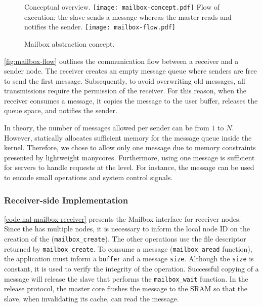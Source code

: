 			\begin{figure}[!tb]
				\centering%
				\caption{Mailbox abstraction concept.}%
				\label{fig:mailbox}%

					{Conceptual overview.}%
					{\texttt{[image: mailbox-concept.pdf]}}%
				\hspace{1cm}%
					{Flow of execution: the slave sends a message whereas the master reads and notifies the sender.}%
					{\texttt{[image: mailbox-flow.pdf]}}%

			\end{figure}

			\autoref{fig:mailbox-flow} outlines the communication flow between a
			receiver and a sender node. The receiver creates an empty message queue
			where senders are free to send the first message. Subsequently, to
			avoid overwriting old messages, all transmissions require the permission
			of the receiver. For this reason,  when the receiver consumes a message,
			it copies the message to the user buffer, releases the queue space, and
			notifies the sender.

			In theory, the number of messages allowed per sender can be from
			$1$ to $N$. However, \nanvixhal statically allocates sufficient
			memory for the message queue inside the kernel. Therefore, we chose
			to allow only one message due to memory constraints presented by
			lightweight manycores. Furthermore, using one message is sufficient	for
			servers to handle requests at the \nanvixmultikernel level. For instance, the
			message can be used to encode small operations and system control signals.

			\subsubsection{Receiver-side Implementation}

					\autoref{code:hal-mailbox-receiver} presents the Mailbox interface for
					receiver nodes. Since the \iocluster has multiple nodes, it is necessary
					to inform the local node ID on the creation of the \mailbox (\texttt{mailbox\_create}). The other
					operations use the file descriptor returned by \texttt{mailbox\_create}.
					To consume a message (\texttt{mailbox\_aread} function), the application must inform a \texttt{buffer} and
					a message \texttt{size}. Although the \texttt{size} is constant, it is used to verify the
					integrity of the operation. Successful copying of a message will release
					the slave that performs the \texttt{mailbox\_wait} function. In the release protocol, the
					master core flushes the message to the SRAM so that the slave, when
					invalidating its cache, can read the message.

